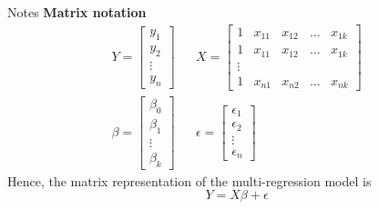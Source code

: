 \documentclass[12pt,a4paper]{beamer}
\begin{document}
			\begin{frame}{Notes}
				\textbf{Matrix notation}
			\small	\begin{eqnarray*}
				Y=	\left[\begin{array}{c} y_1\\
					y_2\\
					\vdots\\
					y_n
				\end{array}\right] &{}& 	X=	\left[\begin{array}{ccccc} 1 & x_{11} &x_{12}&\dots&x_{1k}\\
						 1 & x_{11} &x_{12}&\dots&x_{1k}\\
						\vdots\\
					 1 & x_{n1} &x_{n2}&\dots&x_{nk}
					\end{array}\right]\\
					\beta=\left[\begin{array}{c} \beta_0\\
						\beta_1\\
						\vdots\\
						\beta_k
					\end{array}\right] &{}& 	\epsilon=\left[\begin{array}{c} \epsilon_1\\
							\epsilon_2\\
							\vdots\\
							\epsilon_n
						\end{array}\right] 
				\end{eqnarray*}
			Hence, the matrix representation of the multi-regression model is
			\[Y=X\beta+\epsilon\]	
			
			\end{frame}
\end{document}
